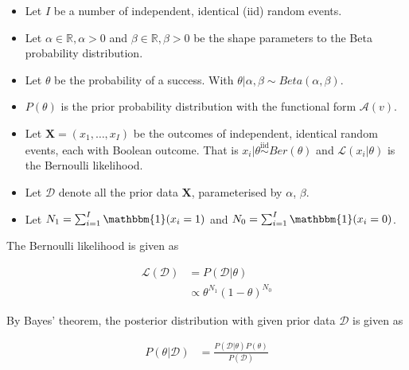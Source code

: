 \begin{itemize}
      \item Let $I$ be a number of independent, identical  (iid) random events.

      \item Let $\alpha \in \mathbb{R}, \alpha > 0$ and $\beta \in \mathbb{R}, \beta >0$ be the shape parameters to the Beta probability distribution.

      \item Let $\theta$ be the probability of a success. With $\theta | \alpha, \beta \sim Beta(\alpha, \beta)$.

      \item $P(\theta)$ is the prior probability distribution with the functional form $\mathcal{A}(v)$.

      \item Let $\boldsymbol{X} = (x_{1}, \dots, x_{I})$ be the outcomes of independent, identical random events, each with Boolean outcome. That is $x_{i} | \theta \overset{\text{iid}}{\sim} Ber(\theta)$ and $\mathcal{L}(x_{i} \vert \theta)$ is the Bernoulli likelihood.

      \item Let $\boldsymbol{\mathcal{D}}$ denote all the prior data $\boldsymbol{X}$, parameterised by $\alpha$, $\beta$.

      \item Let $N_{1} = \sum_{i=1}^{I} \mathbbm{1}(x_{i} = 1)$ and $N_{0} = \sum_{i=1}^{I} \mathbbm{1}(x_{i} = 0)$.
\end{itemize}

The Bernoulli likelihood is given as

\begin{equation}
      \label{eq:probability:conjugate_priors:binom_likelihood:likelihood}
      \begin{split}
            \mathcal{L}(\boldsymbol{\mathcal{D}}) &=  P(\boldsymbol{\mathcal{D}} | \theta) \\
            &\propto \theta^{N_{1}}(1-\theta)^{N_{0}}
      \end{split}
\end{equation}

By Bayes' theorem, the posterior distribution with given prior data $\boldsymbol{\mathcal{D}}$ is given as

\begin{equation}
      \begin{split}
            \label{eq:probability:conjugate_priors:binom_likelihood:posterior}
            P(\theta \vert \boldsymbol{\mathcal{D}}) &= \frac{P(\boldsymbol{\mathcal{D}} | \theta) P(\theta)}{P(\boldsymbol{\mathcal{D}})}
      \end{split}
\end{equation}

